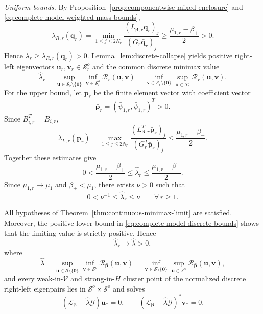 \documentclass[preprint,10pt]{elsarticle}
\theoremstyle{plain}
\theoremstyle{definition}
\theoremstyle{remark}
\begin{document}
\smallskip
\noindent\textit{Uniform bounds.}
By Proposition~\ref{prop:componentwise-mixed-enclosure} and
\eqref{eq:complete-model-weighted-mass-bounds},
\[
\lambda_{R,r}(\mathbf q_r)
=
\min_{1\le j\le2N_r}
\frac{(L_{\boldsymbol\beta,r}\bar{\mathbf q}_r)_j}
{(G_r\bar{\mathbf q}_r)_j}
\ge
\frac{\mu_{1,r}-\beta_+}{2}>0.
\]
Hence $\overline\lambda_r\ge\lambda_{R,r}(\mathbf q_r)>0$.
Lemma~\ref{lem:discrete-collapse} yields positive right-left eigenvectors
$\mathbf u_r,\mathbf v_r\in\mathcal S_r^o$ and the common discrete minimax
value
\begin{equation}\label{eq:complete-model-discrete-minimax-value}
	\hat\lambda_r
	=
	\sup_{\mathbf u\in\mathcal S_r\setminus\{\mathbf0\}}
	\inf_{\mathbf v\in\mathcal S_r^o}\mathcal R_r(\mathbf u,\mathbf v)
	=
	\inf_{\mathbf v\in\mathcal S_r\setminus\{\mathbf0\}}
	\sup_{\mathbf u\in\mathcal S_r^o}\mathcal R_r(\mathbf u,\mathbf v).
\end{equation}
For the upper bound, let $\mathbf p_r$ be the finite element vector with
coefficient vector
\[
\bar{\mathbf p}_r=(\bar\psi_{1,r},\bar\psi_{1,r})^T>0.
\]
Since $B_{i,r}^T=B_{i,r}$,
\[
\lambda_{L,r}(\mathbf p_r)
=
\max_{1\le j\le2N_r}
\frac{(L_{\boldsymbol\beta,r}^T\bar{\mathbf p}_r)_j}
{(G_r^T\bar{\mathbf p}_r)_j}
\le
\frac{\mu_{1,r}-\beta_-}{2}.
\]
Together these estimates give
\begin{equation}\label{eq:complete-model-discrete-bounds}
	0<\frac{\mu_{1,r}-\beta_+}{2}
	\le
	\hat\lambda_r
	\le
	\frac{\mu_{1,r}-\beta_-}{2}.
\end{equation}
Since $\mu_{1,r}\to\mu_1$ and $\beta_+<\mu_1$, there exists $\nu>0$ such that
\[
0<\nu^{-1}\le\hat\lambda_r\le\nu
\qquad \forall\,r\ge1.
\]

All hypotheses of Theorem~\ref{thm:continuous-minimax-limit} are satisfied.
Moreover, the positive lower bound in \eqref{eq:complete-model-discrete-bounds}
shows that the limiting value is strictly positive. Hence
\begin{equation}\label{eq:complete-model-minimax-convergence}
	\hat\lambda_r\longrightarrow\hat\lambda>0,
\end{equation}
where
\begin{equation}\label{eq:complete-model-continuous-minimax}
	\hat\lambda
	=
	\sup_{\mathbf u\in\mathcal S\setminus\{\mathbf0\}}
	\inf_{\mathbf v\in\mathcal S^o}\mathcal R_{\boldsymbol\beta}(\mathbf u,\mathbf v)
	=
	\inf_{\mathbf v\in\mathcal S\setminus\{\mathbf0\}}
	\sup_{\mathbf u\in\mathcal S^o}\mathcal R_{\boldsymbol\beta}(\mathbf u,\mathbf v),
\end{equation}
and every weak-in-\(\mathcal V\) and strong-in-\(H\) cluster point of the
normalized discrete right-left eigenpairs lies in
$\mathcal S^o\times\mathcal S^o$ and solves
\[
(\mathcal L_{\boldsymbol\beta}-\hat\lambda\mathcal G)\mathbf u_*=0,
\qquad
(\mathcal L_{\boldsymbol\beta}-\hat\lambda\mathcal G)^*\mathbf v_*=0.
\]
\end{document}

